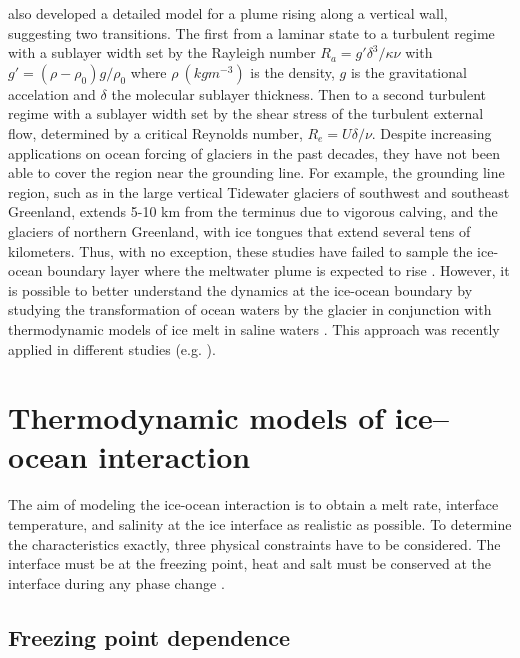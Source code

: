 \documentclass[11pt,a4paper]{article}
\begin{document}
	\cite{wells2008geophysical} also developed a detailed model for a plume rising along a vertical wall, suggesting two transitions. The first from a laminar state to a turbulent regime with a sublayer width set by the Rayleigh number $R_a = g'\delta^3/\kappa\nu$ with $g' = (\rho-\rho_0) g/\rho_0$ where $\rho\ (kgm^{-3})$ is the density, $g$ is the gravitational accelation and $\delta$ the molecular sublayer thickness. Then to a second turbulent regime with a sublayer width set by the shear stress of the turbulent external flow, determined by a critical Reynolds number, $R_e = U\delta/\nu$. Despite increasing applications on ocean forcing of glaciers in the past decades, they have not been able to cover the region near the grounding line. For example, the grounding line region, such as in the large vertical Tidewater glaciers of southwest and southeast Greenland, extends 5-10 km from the terminus due to vigorous calving, and the glaciers of northern Greenland, with ice tongues that extend several tens of kilometers. Thus, with no exception, these studies have failed to sample the ice-ocean boundary layer where the meltwater plume is expected to rise \citep{straneo2012characteristics}. However, it is possible to better understand the dynamics at the ice-ocean boundary by studying the transformation of ocean waters by the glacier in conjunction with thermodynamic models of ice melt in saline waters \citep{holland1999modeling}. This approach was recently applied in different studies (e.g. \cite{jenkins2011convection,gayen2016simulation,hewitt2020subglacial}).
	
	
	
	\section{Thermodynamic models of ice–ocean interaction}
	
    	The aim of modeling the ice-ocean interaction is to obtain a melt rate, interface temperature, and salinity at the ice interface  as realistic as possible. To determine the characteristics exactly, three physical constraints have to be considered. The interface must be at the freezing point, heat and salt must be conserved at the interface during any phase change \citep{holland1999modeling}.
        
        \subsection{Freezing point dependence}
        
\end{document}
